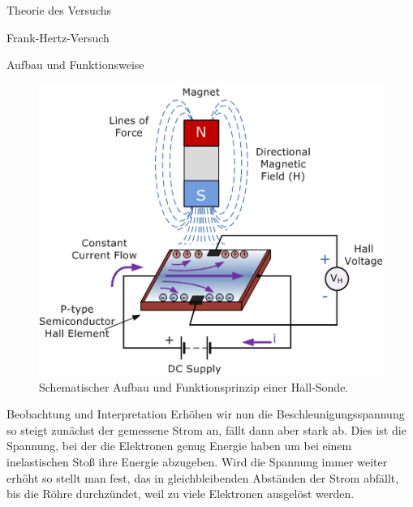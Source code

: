 \documentclass[pdftex, a4paper,11pt, twoside, ngerman]{report}
\begin{document}
\begin{chapter}{Theorie des Versuchs}
\begin{section}{Frank-Hertz-Versuch}
\begin{subsection}{Aufbau und Funktionsweise}
\begin{figure}[ht]
\begin{minipage}{0.48\textwidth}
            \caption{Schematischer Aufbau des Franck-Hertz-Versuches.}
            \label{fig:FHaufbau}
          \end{minipage}\quad
          \begin{minipage}{0.48\textwidth}
            \centering
            \includegraphics[width=\textwidth]{Figures/hall-sensor.png}
                \caption{Schematischer Aufbau und Funktionsprinzip einer
                    Hall-Sonde.}
            \label{fig:hallsensor}
          \end{minipage}
        \end{figure}
        
      \end{subsection}
      
      
      
      \begin{subsection}{Beobachtung und Interpretation}
        Erhöhen wir nun die Beschleunigungsspannung so steigt zunächst der
        gemessene Strom an, fällt dann aber stark ab. Dies ist die Spannung,
        bei der die Elektronen genug Energie haben um bei einem inelastischen
        Stoß ihre Energie abzugeben. Wird die Spannung immer weiter erhöht so
        stellt man fest, das in gleichbleibenden Abständen der Strom abfällt,
        bis die Röhre durchzündet, weil zu viele Elektronen ausgelöst werden. 
        

\end{subsection}
\end{section}
\end{chapter}
\end{document}
